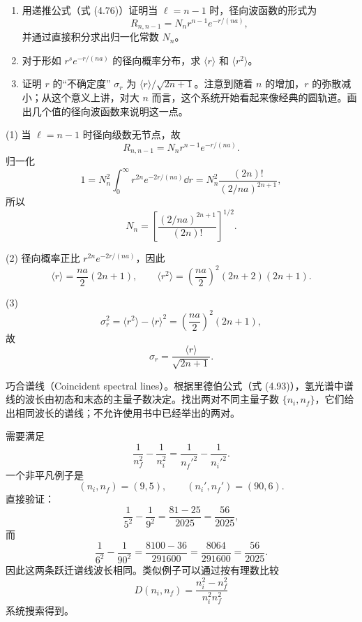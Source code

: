 \begin{question}
\begin{enumerate}
\item 用递推公式（式 (4.76)）证明当 $\ell=n-1$ 时，径向波函数的形式为
\[
R_{n,n-1}=N_n r^{n-1}e^{-r/(na)},
\]
并通过直接积分求出归一化常数 $N_n$。
\item 对于形如 $r^s e^{-r/(na)}$ 的径向概率分布，求 $\langle r\rangle$ 和 $\langle r^2\rangle$。
\item 证明 $r$ 的“不确定度” $\sigma_r$ 为 $\langle r\rangle/\sqrt{2n+1}$。注意到随着 $n$ 的增加，$r$ 的弥散减小；从这个意义上讲，对大 $n$ 而言，这个系统开始看起来像经典的圆轨道。画出几个值的径向波函数来说明这一点。
\end{enumerate}

\par\smallskip
{}

\end{question}
\begin{solution}

(1) 当 $\ell=n-1$ 时径向级数无节点，故
\[
R_{n,n-1}=N_nr^{n-1}e^{-r/(na)}.
\]
归一化
\[
1=N_n^2\int_0^\infty r^{2n}e^{-2r/(na)}\dd r
=N_n^2\frac{(2n)!}{(2/na)^{2n+1}},
\]
所以
\[
N_n=\left[\frac{(2/na)^{2n+1}}{(2n)!}\right]^{1/2}.
\]

(2) 径向概率正比 $r^{2n}e^{-2r/(na)}$，因此
\[
\langle r\rangle=\frac{na}{2}(2n+1),
\qquad
\langle r^2\rangle=\left(\frac{na}{2}\right)^2(2n+2)(2n+1).
\]

(3) 
\[
\sigma_r^2=\langle r^2\rangle-\langle r\rangle^2=\left(\frac{na}{2}\right)^2(2n+1),
\]
故
\[
\sigma_r=\frac{\langle r\rangle}{\sqrt{2n+1}}.
\]

\end{solution}

\begin{question}
巧合谱线（Coincident spectral lines）。根据里德伯公式（式 (4.93)），氢光谱中谱线的波长由初态和末态的主量子数决定。找出两对不同主量子数 $\{n_i,n_f\}$，它们给出相同波长的谱线；不允许使用书中已经举出的两对。

\par\smallskip
{}

\end{question}
\begin{solution}


需要满足
\[
\frac1{n_f^2}-\frac1{n_i^2}=\frac1{{n_f'}^2}-\frac1{{n_i'}^2}.
\]
一个非平凡例子是
\[
(n_i,n_f)=(9,5),\qquad (n_i',n_f')=(90,6).
\]
直接验证：
\[
\frac1{5^2}-\frac1{9^2}=\frac{81-25}{2025}=\frac{56}{2025},
\]
而
\[
\frac1{6^2}-\frac1{90^2}=\frac{8100-36}{291600}=\frac{8064}{291600}=\frac{56}{2025}.
\]
因此这两条跃迁谱线波长相同。类似例子可以通过按有理数比较
\[
D(n_i,n_f)=\frac{n_i^2-n_f^2}{n_i^2n_f^2}
\]
系统搜索得到。


\end{solution}

